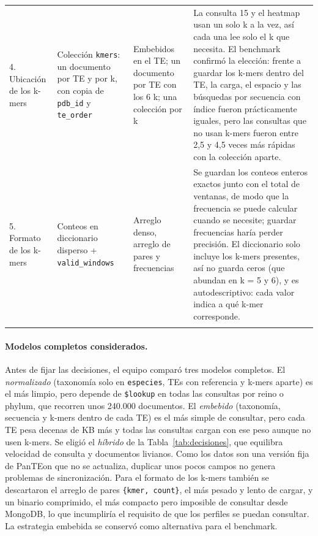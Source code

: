 \documentclass[unnumsec,namedate,webpdf,contemporary,large]{oup-authoring-template}
\begin{document}
\begin{table}[!t]
\begin{tabular}{@{}p{}p{}p{}p{}@{}}
\noalign{\vspace{3pt}}
4. Ubicaci\'on de los k-mers & Colecci\'on \texttt{kmers}: un documento por TE y por k, con copia de \texttt{pdb\_id} y \texttt{te\_order} & Embebidos en el TE; un documento por TE con los 6 k; una colecci\'on por k & La consulta 15 y el heatmap usan un solo k a la vez, as\'i cada una lee solo el k que necesita. El benchmark confirm\'o la elecci\'on: frente a guardar los k-mers dentro del TE, la carga, el espacio y las b\'usquedas por secuencia con \'indice fueron pr\'acticamente iguales, pero las consultas que no usan k-mers fueron entre 2,5 y 4,5 veces m\'as r\'apidas con la colecci\'on aparte. \\
\noalign{\vspace{3pt}}
5. Formato de los k-mers & Conteos en diccionario disperso + \texttt{valid\_windows} & Arreglo denso, arreglo de pares y frecuencias & Se guardan los conteos enteros exactos junto con el total de ventanas, de modo que la frecuencia se puede calcular cuando se necesite; guardar frecuencias har\'ia perder precisi\'on. El diccionario solo incluye los k-mers presentes, as\'i no guarda ceros (que abundan en k = 5 y 6), y es autodescriptivo: cada valor indica a qu\'e k-mer corresponde. \\
\botrule
\end{tabular}
\end{table}

\paragraph{Modelos completos considerados.} Antes de fijar las decisiones, el equipo compar\'o tres modelos completos. El \emph{normalizado} (taxonom\'ia solo en \texttt{especies}, TEs con referencia y k-mers aparte) es el m\'as limpio, pero depende de \texttt{\$lookup} en todas las consultas por reino o phylum, que recorren unos 240.000 documentos. El \emph{embebido} (taxonom\'ia, secuencia y k-mers dentro de cada TE) es el m\'as simple de consultar, pero cada TE pesa decenas de KB m\'as y todas las consultas cargan con ese peso aunque no usen k-mers. Se eligi\'o el \emph{h\'ibrido} de la Tabla~\ref{tab:decisiones}, que equilibra velocidad de consulta y documentos livianos. Como los datos son una versi\'on fija de PanTEon que no se actualiza, duplicar unos pocos campos no genera problemas de sincronizaci\'on. Para el formato de los k-mers tambi\'en se descartaron el arreglo de pares \texttt{\{kmer, count\}}, el m\'as pesado y lento de cargar, y un binario comprimido, el m\'as compacto pero imposible de consultar desde MongoDB, lo que incumplir\'ia el requisito de que los perfiles se puedan consultar. La estrategia embebida se conserv\'o como alternativa para el benchmark.
\end{document}
